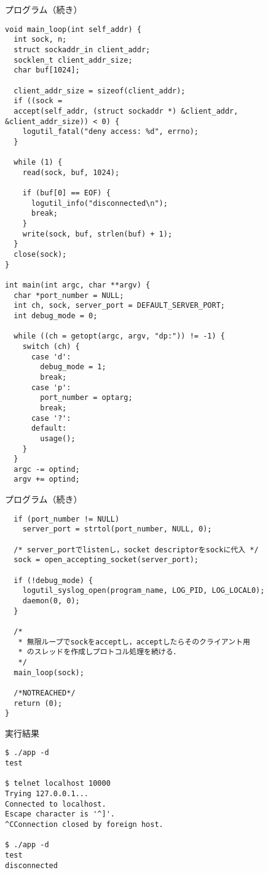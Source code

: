 \documentclass[10pt]{jarticle}
\begin{document}
\begin{itembox}[l]{プログラム（続き）}
  \begin{verbatim}
void main_loop(int self_addr) {
  int sock, n;
  struct sockaddr_in client_addr;
  socklen_t client_addr_size;
  char buf[1024];

  client_addr_size = sizeof(client_addr);
  if ((sock =
  accept(self_addr, (struct sockaddr *) &client_addr, &client_addr_size)) < 0) {
    logutil_fatal("deny access: %d", errno);
  }

  while (1) {
    read(sock, buf, 1024);

    if (buf[0] == EOF) {
      logutil_info("disconnected\n");
      break;
    }
    write(sock, buf, strlen(buf) + 1);
  }
  close(sock);
}

int main(int argc, char **argv) {
  char *port_number = NULL;
  int ch, sock, server_port = DEFAULT_SERVER_PORT;
  int debug_mode = 0;

  while ((ch = getopt(argc, argv, "dp:")) != -1) {
    switch (ch) {
      case 'd':
        debug_mode = 1;
        break;
      case 'p':
        port_number = optarg;
        break;
      case '?':
      default:
        usage();
    }
  }
  argc -= optind;
  argv += optind;
  \end{verbatim}
\end{itembox}

\begin{itembox}[l]{プログラム（続き）}
  \begin{verbatim}
  if (port_number != NULL)
    server_port = strtol(port_number, NULL, 0);

  /* server_portでlistenし，socket descriptorをsockに代入 */
  sock = open_accepting_socket(server_port);

  if (!debug_mode) {
    logutil_syslog_open(program_name, LOG_PID, LOG_LOCAL0);
    daemon(0, 0);
  }

  /*
   * 無限ループでsockをacceptし，acceptしたらそのクライアント用
   * のスレッドを作成しプロトコル処理を続ける．
   */
  main_loop(sock);

  /*NOTREACHED*/
  return (0);
}
  \end{verbatim}
\end{itembox}

\begin{itembox}[l]{実行結果}
  \begin{verbatim}
$ ./app -d
test

$ telnet localhost 10000
Trying 127.0.0.1...
Connected to localhost.
Escape character is '^]'.
^CConnection closed by foreign host.

$ ./app -d
test
disconnected
  
  \end{verbatim}
\end{itembox}
\end{document}
